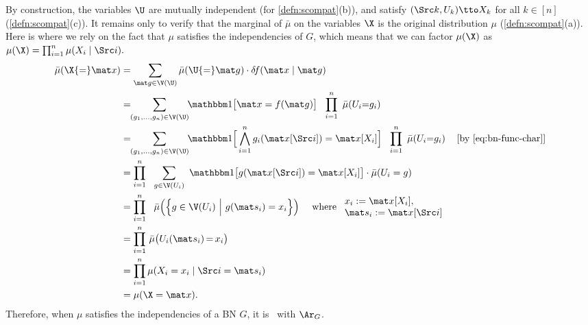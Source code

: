 \begin{subappendices}
\begin{lproof}
    By construction, the variables $\U$ are mutually independent (for \cref{defn:scompat}(b)), and satisfy $(\Src k, U_k) \tto X_k$ for all $k \in [n]$ (\cref{defn:scompat}(c)). 
    It remains only to verify that the marginal of $\bar \mu$ on the variables $\X$ is the original distribution $\mu$ (\cref{defn:scompat}(a)). 
    Here is where we rely on the fact that $\mu$ satisfies the independencies of $G$, which means that we can factor $\mu(\X)$ as    $
        \mu(\X) = \prod_{i=1}^n \mu(X_i \mid \Src i).
    $
    \begin{align*}
        \bar\mu(\X{=}\mat x) 
        &= \sum_{\mat g \in \V(\U)} \bar\mu(\U{=}\mat g) 
            \cdot\delta\!f(\mat x \mid \mat g)
        \\
        &= \!\! \sum_{{(g_1, \ldots, g_n) \in \V(\U)}}\!\!
            \mathbbm1
                \big[
                \mat x = f(\mat g)
                \big] ~~
            \prod_{i=1}^n~ \bar\mu(U_i{=}g_i) \\
        &= \!\! \sum_{{(g_1, \ldots, g_n) \in \V(\U)}}\!\!
            \mathbbm1
                \Big[
                 \bigwedge_{i=1}^n g_i( \mat x[\Src i] ) = \mat x[X_i]
                \Big] ~~
            \prod_{i=1}^n~ \bar\mu(U_i{=}g_i) 
            & [\text{by \eqref{eq:bn-func-char}}]
            \\
        &= \prod_{i=1}^n~~
            \sum_{{g \in \V(U_i)}} ~
            \mathbbm 1\big[ g(\mat x[\Src i]) = \mat x[X_i] \big] 
            \cdot
            \bar\mu(U_i = g) \\
        &= \prod_{i=1}^n~~
            \bar\mu \Big(\Big\{
                    g \in \V(U_i) ~\Big|~
                    g( \mat s_i ) = x_i
                \Big\}\Big)
                \quad\text{ where }
                \begin{array}{l}
                    x_i := \mat x[X_i],\\
                    \mat s_i := \mat x[\Src i]
                \end{array} \\
        &= \prod_{i=1}^n \,
            \bar\mu \big( U_i(\mat s_i) \,{=}\, x_i \big) \\
        &= \prod_{i=1}^n
            \mu(X_i = x_i \mid \Src i = \mat s_i) \\
        &= \mu(\X = \mat x).
    \end{align*}
    Therefore, when $\mu$ satisfies the independencies of a BN $G$, it is \scible\ with $\Ar_G$.
\end{lproof}


\end{subappendices}
